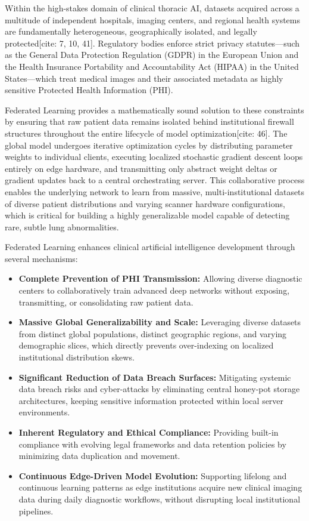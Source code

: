 Within the high-stakes domain of clinical thoracic AI, datasets acquired across a multitude of independent hospitals, imaging centers, and regional health systems are fundamentally heterogeneous, geographically isolated, and legally protected[cite: 7, 10, 41]. Regulatory bodies enforce strict privacy statutes—such as the General Data Protection Regulation (GDPR) in the European Union and the Health Insurance Portability and Accountability Act (HIPAA) in the United States—which treat medical images and their associated metadata as highly sensitive Protected Health Information (PHI). 

Federated Learning provides a mathematically sound solution to these constraints by ensuring that raw patient data remains isolated behind institutional firewall structures throughout the entire lifecycle of model optimization[cite: 46]. The global model undergoes iterative optimization cycles by distributing parameter weights to individual clients, executing localized stochastic gradient descent loops entirely on edge hardware, and transmitting only abstract weight deltas or gradient updates back to a central orchestrating server. This collaborative process enables the underlying network to learn from massive, multi-institutional datasets of diverse patient distributions and varying scanner hardware configurations, which is critical for building a highly generalizable model capable of detecting rare, subtle lung abnormalities.

Federated Learning enhances clinical artificial intelligence development through several mechanisms:

\begin{itemize}
	\item \textbf{Complete Prevention of PHI Transmission:} Allowing diverse diagnostic centers to collaboratively train advanced deep networks without exposing, transmitting, or consolidating raw patient data.
	\item \textbf{Massive Global Generalizability and Scale:} Leveraging diverse datasets from distinct global populations, distinct geographic regions, and varying demographic slices, which directly prevents over-indexing on localized institutional distribution skews.
	\item \textbf{Significant Reduction of Data Breach Surfaces:} Mitigating systemic data breach risks and cyber-attacks by eliminating central honey-pot storage architectures, keeping sensitive information protected within local server environments.
	\item \textbf{Inherent Regulatory and Ethical Compliance:} Providing built-in compliance with evolving legal frameworks and data retention policies by minimizing data duplication and movement.
	\item \textbf{Continuous Edge-Driven Model Evolution:} Supporting lifelong and continuous learning patterns as edge institutions acquire new clinical imaging data during daily diagnostic workflows, without disrupting local institutional pipelines.
\end{itemize}

